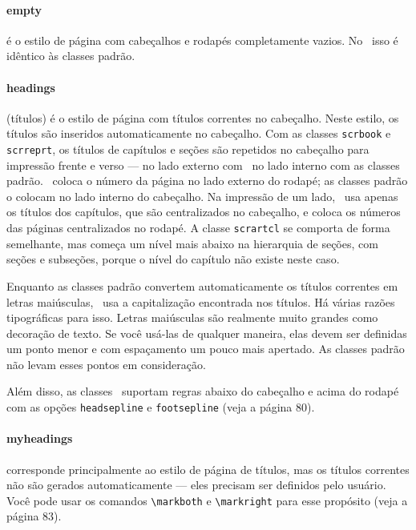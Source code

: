\paragraph{empty} é o estilo de página com cabeçalhos e rodapés completamente vazios. No \KOMAScript\ isso é idêntico às classes padrão.

\paragraph{headings} (títulos) é o estilo de página com títulos correntes no cabeçalho. Neste estilo, os títulos são inseridos automaticamente no cabeçalho. Com as classes \texttt{scrbook} e \texttt{scrreprt}, os títulos de capítulos e seções são repetidos no cabeçalho para impressão frente e verso — no lado externo com \KOMAScript\ no lado interno com as classes padrão. \KOMAScript\ coloca o número da página no lado externo do rodapé; as classes padrão o colocam no lado interno do cabeçalho. Na impressão de um lado, \KOMAScript\ usa apenas os títulos dos capítulos, que são centralizados no cabeçalho, e coloca os números das páginas centralizados no rodapé. A classe \texttt{scrartcl} se comporta de forma semelhante, mas começa um nível mais abaixo na hierarquia de seções, com seções e subseções, porque o nível do capítulo não existe neste caso.

Enquanto as classes padrão convertem automaticamente os títulos correntes em letras maiúsculas, \KOMAScript\ usa a capitalização encontrada nos títulos. Há várias razões tipográficas para isso. Letras maiúsculas são realmente muito grandes como decoração de texto. Se você usá-las de qualquer maneira, elas devem ser definidas um ponto menor e com espaçamento um pouco mais apertado. As classes padrão não levam esses pontos em consideração.

Além disso, as classes \KOMAScript\ suportam regras abaixo do cabeçalho e acima do rodapé com as opções \texttt{headsepline} e \texttt{footsepline} (veja a página 80).

\paragraph{myheadings} corresponde principalmente ao estilo de página de títulos, mas os títulos correntes não são gerados automaticamente --- eles precisam ser definidos pelo usuário. Você pode usar os comandos \verb|\markboth| e \verb|\markright| para esse propósito (veja a página 83).

